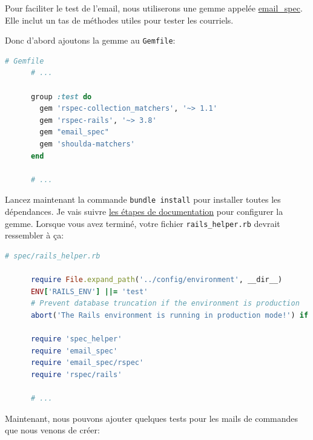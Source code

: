 \documentclass[]{report}
\begin{document}
    Pour faciliter le test de l'email, nous utiliserons une gemme appelée \href{https://github.com/email-spec/email-spec}{email\_spec}. Elle inclut un tas de méthodes utiles pour tester les courriels.

    Donc d'abord ajoutons la gemme au \verb|Gemfile|:

    \begin{scriptsize}
      \begin{lstlisting}[language=ruby]
      # Gemfile
      # ...

      group :test do
        gem 'rspec-collection_matchers', '~> 1.1'
        gem 'rspec-rails', '~> 3.8'
        gem "email_spec"
        gem 'shoulda-matchers'
      end

      # ...
      \end{lstlisting}
    \end{scriptsize}

    Lancez maintenant la commande \verb|bundle install| pour installer toutes les dépendances. Je vais suivre \href{https://github.com/email-spec/email-spec#rspec-31}{les étapes de documentation} pour configurer la gemme. Lorsque vous avez terminé, votre fichier \verb|rails_helper.rb| devrait ressembler à ça:

    \begin{scriptsize}
      \begin{lstlisting}[language=ruby]
      # spec/rails_helper.rb

      require File.expand_path('../config/environment', __dir__)
      ENV['RAILS_ENV'] ||= 'test'
      # Prevent database truncation if the environment is production
      abort('The Rails environment is running in production mode!') if Rails.env.production?

      require 'spec_helper'
      require 'email_spec'
      require 'email_spec/rspec'
      require 'rspec/rails'

      # ...
      \end{lstlisting}
    \end{scriptsize}

    Maintenant, nous pouvons ajouter quelques tests pour les mails de commandes que nous venons de créer:
\end{document}
